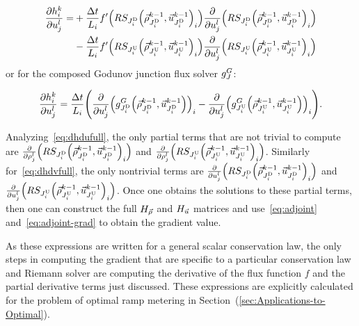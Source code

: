 \begin{align}
\pfrac{\syseq_{\link}^{\tind}}{\condiscrete jl}= & +\frac{\Delta t}{L_{i}}f'\left(\RS_{\jdown{\link}}\left(\juncstate{\jdown{\link}}{\tind-1},\junccon{\jdown{\link}}{\tind-1}\right)_{\link}\right)\pfrac{}{\condiscrete jl}\left(\RS_{\jdown{\link}}\left(\juncstate{\jdown{\link}}{\tind-1},\junccon{\jdown{\link}}{\tind-1}\right)_{\link}\right)\label{eq:dhdvfull} \\
& -\frac{\Delta t}{L_{i}}f'\left(\RS_{\jup{\link}}\left(\juncstate{\jup{\link}}{\tind-1},\junccon{\jup{\link}}{\tind-1}\right)_{\link}\right)\pfrac{}{\condiscrete jl}\left(\RS_{\jup{\link}}\left(\juncstate{\jup{\link}}{\tind-1},\junccon{\jup{\link}}{\tind-1}\right)_{\link}\right)\nonumber                       
\end{align}
or for the composed Godunov junction flux solver $g^{G}_{J}$:

\begin{equation}
\pfrac{\syseq_{\link}^{\tind}}{\condiscrete jl}=\frac{\Delta t}{L_{i}}\left(\pfrac{}{\condiscrete jl}\left(\god_{\jdown{\link}}\left(\juncstate{\jdown{\link}}{\tind-1},\junccon{\jdown{\link}}{\tind-1}\right)\right)_{\link}-\pfrac{}{\condiscrete jl}\left(\god_{\jup{\link}}\left(\juncstate{\jup{\link}}{\tind-1},\junccon{\jup{\link}}{\tind-1}\right)\right)_{\link}\right)\label{eqdhdvgod}.
\end{equation}


Analyzing~\eqref{eq:dhdufull}, the only partial terms that are not
trivial to compute are $\pfrac{}{\discrete jl}\left(\RS_{\jdown{\link}}\left(\juncstate{\jdown{\link}}{\tind-1},\junccon{\jdown{\link}}{\tind-1}\right)_{\link}\right)$
and $\pfrac{}{\discrete jl}\left(\RS_{\jup{\link}}\left(\juncstate{\jup{\link}}{\tind-1},\junccon{\jup{\link}}{\tind-1}\right)_{\link}\right)$.
Similarly for~\eqref{eq:dhdvfull}, the only nontrivial terms are
$\pfrac{}{\condiscrete jl}\left(\RS_{\jdown{\link}}\left(\juncstate{\jdown{\link}}{\tind-1},\junccon{\jdown{\link}}{\tind-1}\right)_{\link}\right)$
and $\pfrac{}{\condiscrete jl}\left(\RS_{\jup{\link}}\left(\juncstate{\jup{\link}}{\tind-1},\junccon{\jup{\link}}{\tind-1}\right)_{\link}\right)$.
Once one obtains the solutions to these partial terms, then one can
construct the full $H_{\vec{\rho}}$ and $H_{\vec{u}}$ matrices and use~\eqref{eq:adjoint}
and~\eqref{eq:adjoint-grad} to obtain the gradient value.

As these expressions are written for a general scalar conservation
law, the only steps in computing the gradient that are specific to
a particular conservation law and Riemann solver are computing the
derivative of the flux function $f$ and the partial derivative terms
just discussed. These expressions are explicitly calculated for the
problem of optimal ramp metering in Section~(\ref{sec:Applications-to-Optimal}).


